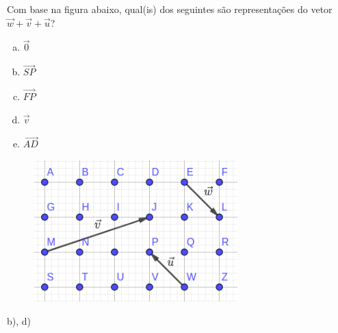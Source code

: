 \begin{exer}
  Com base na figura abaixo, qual(is) dos seguintes são representações do vetor $\vec{w}+\vec{v}+\vec{u}$?
  \begin{enumerate}[a)]
  \item $\overrightarrow{0}$
  \item $\overrightarrow{SP}$
  \item $\overrightarrow{FP}$
  \item $\overrightarrow{v}$
  \item $\overrightarrow{AD}$
  \end{enumerate}
  \begin{figure}[H]
    \centering
    \includegraphics[width=0.7\textwidth]{./cap_vetor/dados/fig_exer_op_basicas/fig_vec_assop}
  \end{figure}
\end{exer}
\begin{resp}
  b), d)
\end{resp}

